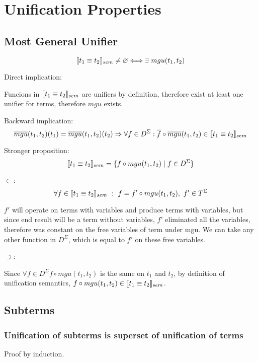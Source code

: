 \documentclass[fleqn]{article}
\begin{document}
\section{Unification Properties}
\subsection{Most General Unifier}

\[ \llbracket t_1 \equiv t_2\rrbracket_{sem} \neq \varnothing \Longleftrightarrow \exists \  mgu(t_1, t_2)  \]

Direct implication:

Funcions in \( \llbracket t_1 \equiv t_2\rrbracket_{sem} \) are unifiers by definition, therefore exist at least one unifier for terms, therefore \( mgu \) exists.

Backward implication:
\[\overline{mgu}(t_1, t_2)(t_1) = \overline{mgu}(t_1, t_2)(t_2) \Rightarrow \forall f \in D^\Sigma: \overline{f} \circ \overline{mgu}(t_1, t_2) \in \llbracket t_1 \equiv t_2\rrbracket_{sem} \]


Stronger proposition:
\[ \llbracket t_1 \equiv t_2 \rrbracket_{sem} = \{ f \circ mgu(t_1, t_2) \mid f \in D^{\Sigma} \} \]

\( \subset \):
\[ \forall f \in \llbracket t_1 \equiv t_2 \rrbracket_{sem}\ :\ f = f' \circ mgu(t_1, t_2),\ f' \in T^\Sigma\]


\( f' \) will operate on terms with variables and produce terms with variables, but since end result will be a term without variables, \(f'\) eliminated all the variables, therefore was constant on the free variables of term under mgu. We can take any other function in \(D^\Sigma\), which is equal to \(f'\) on these free variables.



\( \supset \):


Since \( \forall f \in D^{\Sigma} f \circ mgu(t_1, t_2) \) is the same on \(t_1\) and \(t_2\), by definition of unification semantics, \( f \circ mgu(t_1, t_2) \in \llbracket t_1 \equiv t_2 \rrbracket_{sem}\).

\subsection{Subterms}
\subsubsection{ Unification of subterms is superset of unification of terms }


Proof by induction.
\end{document}
